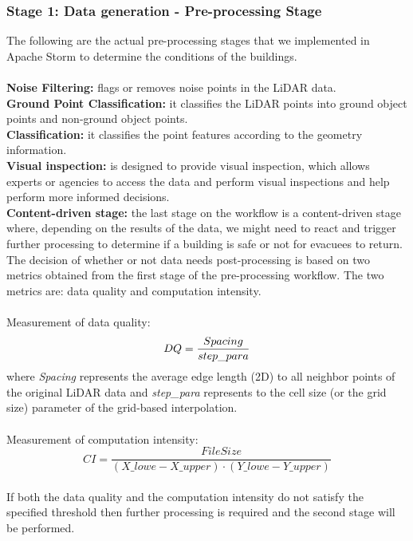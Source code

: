 \subsubsection{Stage 1: Data generation - Pre-processing Stage}
The following are the actual pre-processing stages that we implemented in Apache Storm to determine the  conditions of the buildings.
\\\\
\textbf{Noise Filtering:} flags or removes noise points in the LiDAR data.
\\
\textbf{Ground Point Classification:} it classifies the LiDAR points into ground object points and non-ground object points.
\\
\noindent\textbf{Classification:} it classifies the point features according to the geometry information. 
\\
\noindent\textbf{Visual inspection:} is designed to provide visual inspection, which allows experts or agencies to access the data and perform visual inspections and help perform more informed decisions.
\\
\noindent\textbf{Content-driven stage:} the last stage on the workflow is a content-driven stage where, depending on the results of the data, we might need to react and trigger further processing to determine if a building is safe or not for evacuees to return. The decision of whether or not data needs post-processing is based on two metrics obtained from the first stage of the pre-processing workflow. The two metrics are: data quality and computation intensity. 
\\
\\
Measurement of data quality: 
\begin{equation}
DQ=\frac{Spacing}{step\_para}\\
\end{equation}
where \textit{Spacing} represents the average edge length (2D) to all neighbor points of the original LiDAR data and \textit{step\_para} represents to the cell size (or the grid size) parameter of the grid-based interpolation.\\
\\
Measurement of computation intensity: 
\begin{equation}
CI=\frac{FileSize}{(X\_lowe - X\_upper) \cdot (Y\_lowe - Y\_upper)}
\end{equation}
\\
\noindent If both the data quality and the computation intensity do not satisfy the specified threshold then further processing is required and the second stage will be performed. 

